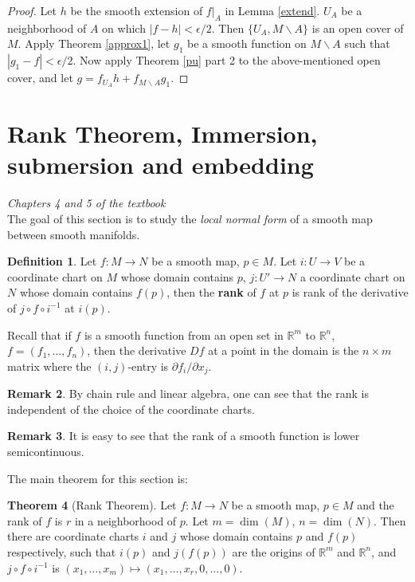 \documentclass{article}
\theoremstyle{definition}
\newtheorem{thm}{Theorem}[section]
\newtheorem{dfn}[thm]{Definition}
\newtheorem{rmk}[thm]{Remark}
\begin{document}
\begin{proof}
    Let $h$ be the smooth extension of $f|_A$ in Lemma \ref{extend}. $U_A$ be a neighborhood of $A$ on which $|f-h|<\epsilon/2$. Then $\{U_A, M\backslash A\}$ is an open cover of $M$. Apply Theorem \ref{approx1}, let $g_1$ be a smooth function on $M\backslash A$ such that $|g_1-f|<\epsilon/2$.  Now apply Theorem \ref{pu} part 2 to the above-mentioned open cover, and let $g=f_{U_A}h+f_{M\backslash A}g_1$.
\end{proof}



\newpage

\section{Rank Theorem, Immersion, submersion and embedding}
\label{sec:rank}

{\em Chapters 4 and 5 of the textbook}\\

The goal of this section is to study the {\em local normal form} of a smooth map between smooth manifolds.\\

\begin{dfn}
Let $f: M\rightarrow N$ be a smooth map, $p\in M$. Let $i: U\rightarrow V$ be a coordinate chart on $M$ whose domain contains $p$, $j: U'\rightarrow N$ a coordinate chart on $N$ whose domain contains $f(p)$, then the {\bf rank} of $f$ at $p$ is rank of the derivative of $j\circ f\circ i^{-1}$ at $i(p)$.
\end{dfn}

Recall that if $f$ is a smooth function from an open set in $\mathbb{R}^m$ to $\mathbb{R}^n$, $f=(f_1, \dots, f_n)$, then the derivative $Df$ at a point in the domain is the $n\times m$ matrix where the $(i, j)$-entry is $\partial f_i/\partial x_j$.

\begin{rmk}
    By chain rule and linear algebra, one can see that the rank is independent of the choice of the coordinate charts. 
\end{rmk}

\begin{rmk}
    It is easy to see that the rank of a smooth function is lower semicontinuous.
\end{rmk}

The main theorem for this section is:

\begin{thm}[Rank Theorem]\label{rank}
    Let $f: M\rightarrow N$ be a smooth map, $p\in M$ and the rank of $f$ is $r$ in a neighborhood of $p$. Let $m=\dim(M)$, $n=\dim(N)$. Then there are coordinate charts $i$ and $j$ whose domain contains $p$ and $f(p)$ respectively, such that $i(p)$ and $j(f(p))$ are the origins of $\mathbb{R}^m$ and $\mathbb{R}^n$, and $j\circ f\circ i^{-1}$ is $(x_1, \dots, x_m)\mapsto (x_1, \dots, x_r, 0, \dots, 0)$.
\end{thm}
\end{document}
